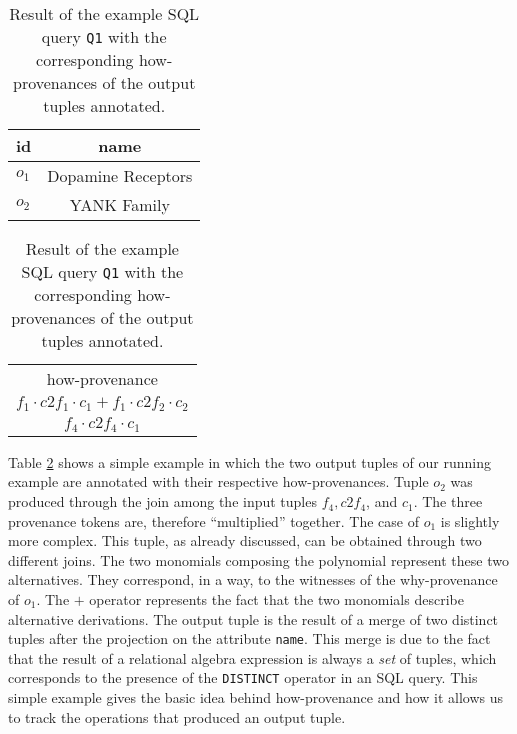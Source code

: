 \begin{table}[]
\centering
  \begin{tabular}{|l|c|}
  \hline
    id & name\\
    \hline
    $o_1$ &  Dopamine Receptors\\
    $o_2$ & YANK Family\\
    \hline
  \end{tabular}
  \begin{tabular}{c}
  	how-provenance   \\
  	$f_1 \cdot c2f_1 \cdot c_1 + f_1 \cdot c2f_2 \cdot c_2$ \\
  	$f_4 \cdot c2f_4 \cdot c_1$ \\
  \end{tabular}
    \caption{Result of the example SQL query \texttt{Q1} with the corresponding how-provenances of the output tuples annotated.}
  \label{table:result_how_prov}
\end{table} 

Table \ref{table:result_how_prov} shows a simple example in which the two output tuples of our running example are annotated with their respective how-provenances. 
Tuple $o_2$ was produced through the join among the input tuples $f_4, c2f_4$, and $c_1$. The three provenance tokens are, therefore  ``multiplied'' together. 
The case of $o_1$ is slightly more complex. This tuple, as already discussed, can be obtained through two different joins. The two monomials composing the polynomial represent these two alternatives. They correspond, in a way, to the witnesses of the why-provenance of $o_1$.
The $+$ operator represents the fact that the two monomials describe alternative derivations. The output tuple is the result of a merge of two distinct tuples after the projection on the attribute \texttt{name}. This merge is due to the fact that the result of a relational algebra expression is always a {\em set} of tuples, which corresponds to the presence of the \texttt{DISTINCT} operator in an SQL query. 
This simple example gives the basic idea behind how-provenance and how it allows us to track the operations that produced an output tuple. 


